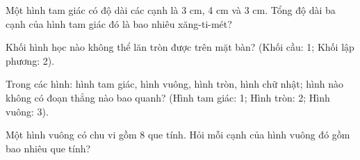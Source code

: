 \begin{ex} %
Một hình tam giác có độ dài các cạnh là 3 cm, 4 cm và 3 cm. Tổng độ dài ba cạnh của hình tam giác đó là bao nhiêu xăng-ti-mét?
\end{ex}

\begin{ex} %
Khối hình học nào không thể lăn tròn được trên mặt bàn? (Khối cầu: 1; Khối lập phương: 2).
\end{ex}

\begin{ex} %
Trong các hình: hình tam giác, hình vuông, hình tròn, hình chữ nhật; hình nào không có đoạn thẳng nào bao quanh? (Hình tam giác: 1; Hình tròn: 2; Hình vuông: 3).
\end{ex}

\begin{ex} %
Một hình vuông có chu vi gồm 8 que tính. Hỏi mỗi cạnh của hình vuông đó gồm bao nhiêu que tính?
\end{ex}
